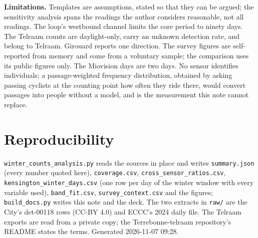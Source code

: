 \documentclass[11pt,a4paper]{article}
\begin{document}
\textbf{Limitations.} Templates are assumptions, stated so that they can be argued; the sensitivity analysis spans the readings the author considers reasonable, not all readings. The loop\textquoteright{}s westbound channel limits the core period to ninety days. The Telraam counts are daylight-only, carry an unknown detection rate, and belong to Telraam. Girouard reports one direction. The survey figures are self-reported from memory and come from a voluntary sample; the comparison uses its public figures only. The Miovision days are two days. No sensor identifies individuals; a passage-weighted frequency distribution, obtained by asking passing cyclists at the counting point how often they ride there, would convert passages into people without a model, and is the measurement this note cannot replace.

\section{Reproducibility}
\texttt{winter\_counts\_analysis.py} reads the sources in place and writes \texttt{summary.json} (every number quoted here), \texttt{coverage.csv}, \texttt{cross\_sensor\_ratios.csv}, \texttt{kensington\_winter\_days.csv} (one row per day of the winter window with every variable used), \texttt{band\_fit.csv}, \texttt{survey\_context.csv} and the figures; \texttt{build\_docs.py} writes this note and the deck. The two extracts in \texttt{raw/} are the City\textquoteright{}s det-00118 rows (CC-BY 4.0) and ECCC\textquoteright{}s 2024 daily file. The Telraam exports are read from a private copy; the Terrebonne-telraam repository\textquoteright{}s README states the terms. Generated 2026-11-07 09:28.
\end{document}
